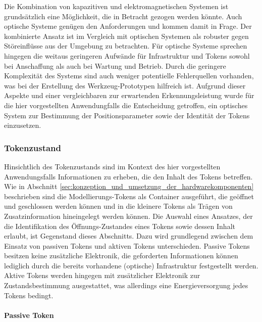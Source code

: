 Die Kombination von kapazitiven und elektromagnetischen Systemen ist grundsätzlich eine Möglichkeit, die in Betracht gezogen werden könnte. Auch optische Systeme genügen den Anforderungen und kommen damit in Frage. Der kombinierte Ansatz ist im Vergleich mit optischen Systemen als robuster gegen Störeinflüsse aus der Umgebung zu betrachten. Für optische Systeme sprechen hingegen die weitaus geringeren Aufwände für Infrastruktur und Tokens sowohl bei Anschaffung als auch bei Wartung und Betrieb. Durch die geringere Komplexität des Systems sind auch weniger potentielle Fehlerquellen vorhanden, was bei der Erstellung des Werkzeug-Prototypen hilfreich ist. Aufgrund dieser Aspekte und einer vergleichbaren zur erwartenden Erkennungsleistung wurde für die hier vorgestellten Anwendungfalls die Entscheidung getroffen, ein optisches System zur Bestimmung der Positionsparameter sowie der Identität der Tokens einzusetzen.



\subsubsection{Tokenzustand} %
\label{ssub:tokenzustand}

Hinsichtlich des Tokenzustands sind im Kontext des hier vorgestellten Anwendungsfalls Informationen zu erheben, die den Inhalt des Tokens betreffen. Wie in Abschnitt \ref{sec:konzeption_und_umsetzung_der_hardwarekomponenten} beschrieben sind die Modellierungs-Tokens als Container ausgeführt, die geöffnet und geschlossen werden können und in die kleinere Tokens als Trägen von Zusatzinformation hineingelegt werden können. Die Auswahl eines Ansatzes, der die Identifikation des Öffnungs-Zustandes eines Tokens sowie dessen Inhalt erlaubt, ist Gegenstand dieses Abschnitts. Dazu wird grundlegend zwischen dem Einsatz von passiven Tokens und aktiven Tokens unterschieden. Passive Tokens besitzen keine zusätzliche Elektronik, die geforderten Informationen können lediglich durch die bereits vorhandene (optische) Infrastruktur festgestellt werden. Aktive Tokens werden hingegen mit zusätzlicher Elektronik zur Zustandsbestimmung ausgestattet, was allerdings eine Energieversorgung jedes Tokens bedingt.

\paragraph{Passive Token} %
\label{par:passive_token}
 
